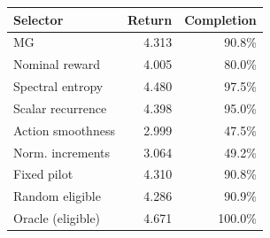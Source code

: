 \begin{tabular}{lrr}
\toprule
Selector & Return & Completion \\
\midrule
MG & 4.313 & 90.8\% \\
Nominal reward & 4.005 & 80.0\% \\
Spectral entropy & 4.480 & 97.5\% \\
Scalar recurrence & 4.398 & 95.0\% \\
Action smoothness & 2.999 & 47.5\% \\
Norm. increments & 3.064 & 49.2\% \\
Fixed pilot & 4.310 & 90.8\% \\
Random eligible & 4.286 & 90.9\% \\
Oracle (eligible) & 4.671 & 100.0\% \\
\bottomrule
\end{tabular}